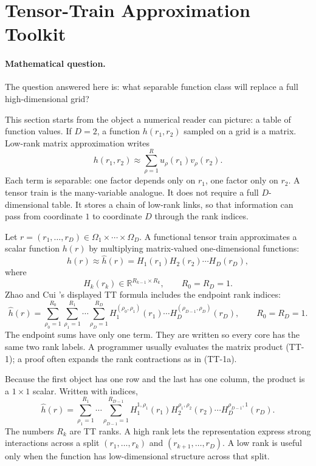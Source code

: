 \documentclass[11pt]{article}
\numberwithin{equation}{section}
\newcommand{\R}{\mathbb R}
\begin{document}
\section{Tensor-Train Approximation Toolkit}

\paragraph{Mathematical question.}
The question answered here is: what separable function class will replace a
full high-dimensional grid?

This section starts from the object a numerical reader can picture: a table of
function values.  If \(D=2\), a function \(h(r_1,r_2)\) sampled on a grid is a
matrix.  Low-rank matrix approximation writes
\[
    h(r_1,r_2)\approx \sum_{\rho=1}^{R} u_\rho(r_1)v_\rho(r_2).
\]
Each term is separable: one factor depends only on \(r_1\), one factor only on
\(r_2\).  A tensor train is the many-variable analogue.  It does not require a
full \(D\)-dimensional table.  It stores a chain of low-rank links, so that
information can pass from coordinate \(1\) to coordinate \(D\) through the rank
indices.

Let \(r=(r_1,\ldots,r_D)\in\Omega_1\times\cdots\times\Omega_D\).  A functional
tensor train approximates a scalar function \(h(r)\) by multiplying
matrix-valued one-dimensional functions:
\begin{equation}
    h(r)
    \approx
    \widehat h(r)
    =
    H_1(r_1)H_2(r_2)\cdots H_D(r_D),
    \label{eq:p24-tt-1}
\end{equation}
where
\[
    H_k(r_k)\in \R^{R_{k-1}\times R_k},\qquad R_0=R_D=1.
\]
Zhao and Cui \cite{zhao2024ttsequential}'s displayed TT formula includes the endpoint rank indices:
\begin{equation}
    \widehat h(r)
    =
    \sum_{\rho_0=1}^{R_0}\sum_{\rho_1=1}^{R_1}\cdots
    \sum_{\rho_D=1}^{R_D}
    H_1^{(\rho_0,\rho_1)}(r_1)\cdots
    H_D^{(\rho_{D-1},\rho_D)}(r_D),
    \qquad R_0=R_D=1.
    \label{eq:p24-tt-1a}
\end{equation}
The endpoint sums have only one term.  They are written so every core has the
same two rank labels.  A programmer usually evaluates the matrix product
(TT-1); a proof often expands the rank contractions as in (TT-1a).

Because the first object has one row and the last has one column, the product is
a \(1\times 1\) scalar.  Written with indices,
\begin{equation}
    \widehat h(r)
    =
    \sum_{\rho_1=1}^{R_1}\cdots
    \sum_{\rho_{D-1}=1}^{R_{D-1}}
    H_1^{1,\rho_1}(r_1)
    H_2^{\rho_1,\rho_2}(r_2)\cdots
    H_D^{\rho_{D-1},1}(r_D).
    \label{eq:p24-tt-2}
\end{equation}
The numbers \(R_k\) are TT ranks.  A high rank lets the representation express
strong interactions across a split \((r_1,\ldots,r_k)\) and
\((r_{k+1},\ldots,r_D)\).  A low rank is useful only when the function has
low-dimensional structure across that split.
\end{document}
